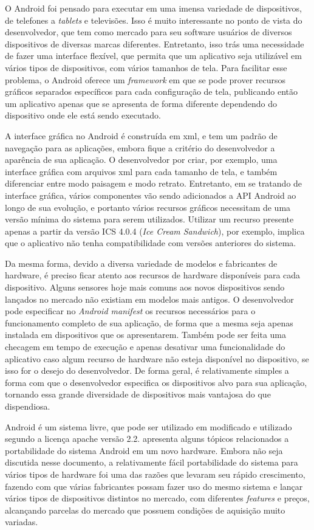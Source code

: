 O Android foi pensado para executar em uma imensa variedade de dispositivos, de telefones a \textit{tablets} e televisões. Isso é muito interessante no ponto de vista do desenvolvedor, que tem como mercado para seu software usuários de diversos dispositivos de diversas marcas diferentes. Entretanto, isso trás uma necessidade de fazer uma interface flexível, que permita que um aplicativo seja utilizável em vários tipos de dispositivos, com vários tamanhos de tela. Para facilitar esse problema, o Android oferece um \textit{framework} em que se pode prover recursos gráficos separados específicos para cada configuração de tela, publicando então um aplicativo apenas que se apresenta de forma diferente dependendo do dispositivo onde ele está sendo executado.  

A interface gráfica no Android é construída em xml, e tem um padrão de navegação para as aplicações, embora fique a critério do desenvolvedor a aparência de sua aplicação. O desenvolvedor por criar, por exemplo, uma interface gráfica com arquivos xml para cada tamanho de tela, e também diferenciar entre modo paisagem e modo retrato. Entretanto, em se tratando de interface gráfica, vários componentes vão sendo adicionados a API Android ao longo de sua evolução, e portanto vários recursos gráficos necessitam de uma versão mínima do sistema para serem utilizados. Utilizar um recurso presente apenas a partir da versão ICS 4.0.4 (\textit{Ice Cream Sandwich}), por exemplo, implica que o aplicativo não tenha compatibilidade com versões anteriores do sistema.  

Da mesma forma, devido a diversa variedade de modelos e fabricantes de hardware, é preciso ficar atento aos recursos de hardware disponíveis para cada dispositivo. Alguns sensores hoje mais comuns aos novos dispositivos sendo lançados no mercado não existiam em modelos mais antigos. O desenvolvedor pode especificar no \textit{Android manifest} os recursos necessários para o funcionamento completo de sua aplicação, de forma que a mesma seja apenas instalada em dispositivos que os apresentarem. Também pode ser feita uma checagem em tempo de execução e apenas desativar uma funcionalidade do aplicativo caso algum recurso de hardware não esteja disponível no dispositivo, se isso for o desejo do desenvolvedor. De forma geral, é relativamente simples a forma com que o desenvolvedor especifica os dispositivos alvo para sua aplicação, tornando essa grande diversidade de dispositivos mais vantajosa do que dispendiosa. 

Android é um sistema livre, que pode ser utilizado em modificado e utilizado segundo a licença apache versão 2.2.  apresenta alguns tópicos relacionados a portabilidade do sistema Android em um novo hardware. Embora não seja discutida nesse documento, a relativamente fácil portabilidade do sistema para vários tipos de hardware foi uma das razões que levaram seu rápido crescimento, fazendo com que várias fabricantes possam fazer uso do mesmo sistema e lançar vários tipos de dispositivos distintos no mercado, com diferentes \textit{features} e preços, alcançando parcelas do mercado que possuem condições de aquisição muito variadas.
